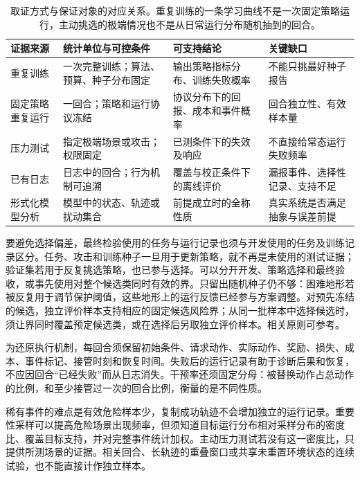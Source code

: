 \begin{table}[t]
  \centering
  \begin{tabularx}{\linewidth}{@{}>{\raggedright\arraybackslash}p{23mm}XXX@{}}
    \toprule
    证据来源 & 统计单位与可控条件 & 可支持结论 & 关键缺口 \\
    \midrule
    重复训练 & 一次完整训练；算法、预算、种子分布固定 & 输出策略指标分布、训练失败概率 & 不能只挑最好种子报告 \\
    固定策略重复运行 & 一回合；策略和运行协议冻结 & 协议分布下的回报、成本和事件概率 & 回合独立性、有效样本量 \\
    压力测试 & 指定极端场景或攻击；权限固定 & 已测条件下的失效及响应 & 不直接给常态运行失败频率 \\
    已有日志 & 日志中的回合；行为机制可追溯 & 覆盖与校正条件下的离线评价 & 漏报事件、选择性记录、支持不足 \\
    形式化模型分析 & 模型中的状态、轨迹或扰动集合 & 前提成立时的全称性质 & 真实系统是否满足抽象与误差前提 \\
    \bottomrule
  \end{tabularx}
  \caption{取证方式与保证对象的对应关系。重复训练的一条学习曲线不是一次固定策略运行，主动挑选的极端情况也不是从日常运行分布随机抽到的回合。}
  \label{tab:rl-trustworthy-evidence-sources}
\end{table}

要避免选择偏差，最终检验使用的任务与运行记录也须与开发使用的任务及训练记录区分。任务、攻击和训练种子一旦用于更新策略，就不再是未使用的测试证据；验证集若用于反复挑选策略，也已参与选择。可以分开开发、策略选择和最终验收，或事先使用对整个候选类同时有效的界。只留出随机种子仍不够：困难地形若被反复用于调节保护阈值，这些地形上的运行反馈已经参与方案调整。对预先冻结的候选，独立评价样本支持相应的固定候选风险界；从同一批样本中选择候选时，须让界同时覆盖预定候选类，或在选择后另取独立评价样本。相关原则可参考。

为还原执行机制，每回合须保留初始条件、请求动作、实际动作、奖励、损失、成本、事件标记、接管时刻和恢复时间。失败后的运行记录有助于诊断后果和恢复，不应因回合“已经失败”而从日志消失。干预率还须固定分母：被替换动作占总动作的比例，和至少接管过一次的回合比例，衡量的是不同性质。

稀有事件的难点是有效危险样本少，复制成功轨迹不会增加独立的运行记录。重要性采样可以提高危险场景出现频率，但须知道目标运行分布相对采样分布的密度比、覆盖目标支持，并对完整事件统计加权。主动压力测试若没有这一密度比，只提供所测场景的证据。相关回合、长轨迹的重叠窗口或共享未重置环境状态的连续试验，也不能直接计作独立样本。


